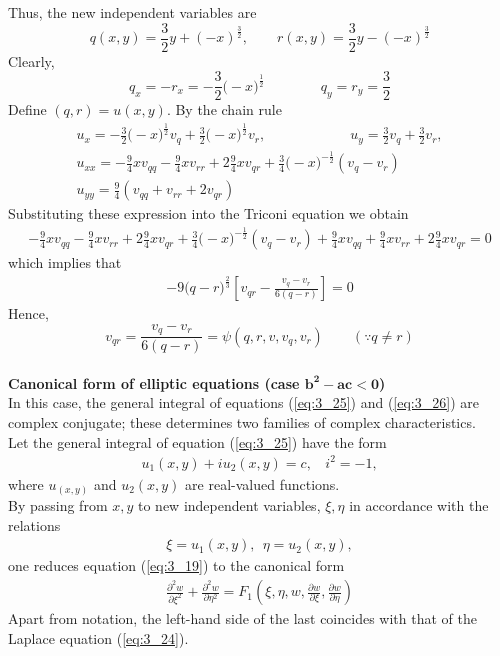 \documentclass[11pt]{report}
\newcommand{\NI}{\noindent}
\newcommand{\sps}{\\[0.2cm]}
\newcommand{\refn}[1]{(\ref{#1})}
\newcommand{\refx}[1]{\refn{eq:#1}}
\newcommand{\bt}[1]{\textbf{#1}}
\begin{document}
	\NI Thus, the new independent variables are
	\begin{equation*}
		q(x,y) = \frac{3}{2}y+(-x)^{\frac{3}{2}}, \qquad  r(x,y)=\frac{3}{2}y-(-x)^{\frac{3}{2}}\label{ex:3_3_7} 
	\end{equation*}
	Clearly,
	\begin{equation*}
		q_x = -r_x = -\frac{3}{2}\Big(-x\Big)^{\frac{1}{2}}\qquad\qquad q_y = r_y = \frac{3}{2}\label{ex:3_3_8}
	\end{equation*}
	Define $(q,r) = u(x,y)$. By the chain rule
	\begin{equation*}
		\begin{array}{l}
			u_x = -\frac{3}{2}\Big(-x\Big)^{\frac{1}{2}}v_q + \frac{3}{2}\Big(-x\Big)^{\frac{1}{2}}v_r,\qquad\qquad\qquad u_y = \frac{3}{2}v_q + \frac{3}{2}v_r,\\
			u_{xx} = - \frac{9}{4}xv_{qq} - \frac{9}{4}xv_{rr} + 2\frac{9}{4}xv_{qr}+\frac{3}{4}\Big(-x\Big)^{-\frac{1}{2}}(v_q-v_r)\\
			u_{yy} = \frac{9}{4}(v_{qq}+v_{rr}+2v_{qr})
		\end{array}
	\end{equation*}
	Substituting these expression into the Triconi equation we obtain
	\begin{eqnarray*}
		- \frac{9}{4}xv_{qq} - \frac{9}{4}xv_{rr} + 2\frac{9}{4}xv_{qr}+\frac{3}{4}\Big(-x\Big)^{-\frac{1}{2}}(v_q-v_r)+ \frac{9}{4}xv_{qq} + \frac{9}{4}xv_{rr} + 2\frac{9}{4}xv_{qr}=0
	\end{eqnarray*}
	which implies that
	\begin{eqnarray*}
		-9\Big(q-r\Big)^{\frac{2}{3}}\left[v_{qr}-\frac{v_q - v_r}{6(q-r)}\right] = 0
	\end{eqnarray*}
	Hence,
	\begin{equation*}
		v_{qr} = \frac{v_q - v_r}{6(q-r)} = \psi(q,r,v,v_q,v_r)\qquad (\because q \neq r)\label{ex:3_3_9} 
	\end{equation*}
	{~}\sps

	\NI\bt{Canonical form of elliptic equations (case $\mathbf{b^2-ac<0}$)}\\
	In this case, the general integral of equations \refx{3_25} and \refx{3_26} are complex conjugate; these determines two families of complex characteristics.\\
	Let the general integral of equation \refx{3_25} have the form
	\begin{eqnarray*}
		u_1(x,y)+iu_2(x,y)=c, ~~~~ i^2 = -1,
	\end{eqnarray*}
	where $u_(x,y)$ and $u_2(x,y)$ are real-valued functions.\sps
	By passing from $x,y$ to new independent variables, $\xi, \eta$ in accordance with the relations
	\begin{eqnarray*}
		\xi = u_1(x,y),~~ \eta=u_2(x,y),
	\end{eqnarray*}
	one reduces equation \refx{3_19} to the canonical form
	\begin{eqnarray*}
		\frac{\partial^2 w}{\partial \xi^2} + \frac{\partial^2 w}{\partial \eta^2} = F_1\left(\xi,\eta,w,\frac{\partial w}{\partial\xi},\frac{\partial w}{\partial\eta}\right)
	\end{eqnarray*}
	Apart from notation, the left-hand side of the last coincides with that of the Laplace equation \refx{3_24}.
	
\end{document}
